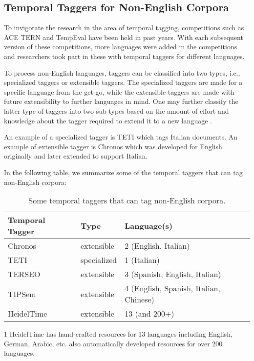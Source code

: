 \subsection{Temporal Taggers for Non-English Corpora}
To invigorate the research in the area of temporal tagging, competitions such as ACE TERN and TempEval have been held in past years. With each subsequent version of these competitions, more languages were added in the competitions and researchers took part in these with temporal taggers for different languages. 

To process non-English languages, taggers can be classified into two types, i.e., specialized taggers or extensible taggers. The specialized taggers are made for a specific language from the get-go, while the extensible taggers are made with future extensibility to further languages in mind. One may further classify the latter type of taggers into two sub-types based on the amount of effort and knowledge about the tagger required to extend it to a new language \cite{DBLP:phd/de/Strotgen15}. 

An  example of a specialized tagger is TETI \cite{DBLP:conf/imcsit/CasellidP09} which tags Italian documents. An example of extensible tagger is Chronos \cite{negri2004recognition} which was developed for English originally and later extended to support Italian.

In the following table, we summarize some of the temporal taggers that can tag non-English corpora:  

\begin{table}[H] \label{the-ttaggers-table2}
	\centering
	\begin{threeparttable}
		\begin{tabular}{||l l l||} 
			\hline
			\textbf{Temporal Tagger} & \textbf{Type} & \textbf{Language(s)} \\ [0.5ex] 
			\hline\hline
			Chronos \cite{negri2004recognition, negri2007dealing} & extensible & 2 (English, Italian)  \\
			TETI \cite{DBLP:conf/imcsit/CasellidP09} & specialized & 1 (Italian) \\
			TERSEO \cite{DBLP:journals/dke/SaqueteMM06, negri2006evaluating} & extensible & 3 (Spanish, English, Italian)  \\
			TIPSem \cite{DBLP:conf/semeval/LlorensSN10} & extensible & 4 (English, Spanish, Italian, Chinese)  \\
			HeidelTime \cite{DBLP:conf/semeval/StrotgenG10, DBLP:conf/emnlp/StrotgenG15} & extensible & 13 (and 200+)\tnote{1}   \\ [1ex]
			\hline
		\end{tabular}
		\begin{tablenotes}
			\item[1] HeidelTime has hand-crafted resources for 13 languages including English, German, Arabic, etc. also automatically developed resources for over 200 languages.
		\end{tablenotes}
	\end{threeparttable}
	\caption{Some temporal taggers that can tag non-English corpora.}
	\label{table:1c}
\end{table}




